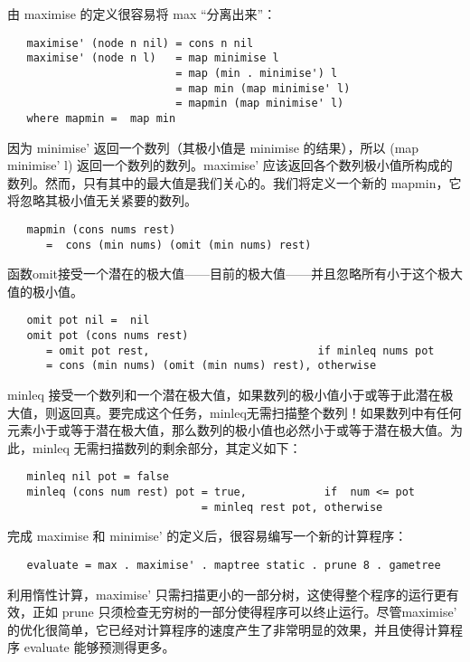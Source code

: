 \documentclass[12pt]{article}
\begin{document}
由 maximise 的定义很容易将 max ``分离出来''：

\begin{verbatim}
   maximise' (node n nil) = cons n nil
   maximise' (node n l)   = map minimise l
                          = map (min . minimise') l
                          = map min (map minimise' l)
                          = mapmin (map minimise' l)
   where mapmin =  map min
\end{verbatim}

因为 minimise' 返回一个数列（其极小值是 minimise 的结果），所以 (map minimise' l) 返回一个数列的数列。maximise' 应该返回各个数列极小值所构成的数列。然而，只有其中的最大值是我们关心的。我们将定义一个新的 mapmin，它将忽略其极小值无关紧要的数列。

\begin{verbatim}
   mapmin (cons nums rest)
      =  cons (min nums) (omit (min nums) rest)
\end{verbatim}

函数omit接受一个潜在的极大值——目前的极大值——并且忽略所有小于这个极大值的极小值。
\begin{verbatim}
   omit pot nil =  nil
   omit pot (cons nums rest)
      = omit pot rest,                          if minleq nums pot
      = cons (min nums) (omit (min nums) rest), otherwise
\end{verbatim}

minleq 接受一个数列和一个潜在极大值，如果数列的极小值小于或等于此潜在极大值，则返回真。要完成这个任务，minleq无需扫描整个数列！如果数列中有任何元素小于或等于潜在极大值，那么数列的极小值也必然小于或等于潜在极大值。为此，minleq 无需扫描数列的剩余部分，其定义如下：

\begin{verbatim}
   minleq nil pot = false
   minleq (cons num rest) pot = true,            if  num <= pot
                              = minleq rest pot, otherwise
\end{verbatim}

完成 maximise 和 minimise' 的定义后，很容易编写一个新的计算程序：

\begin{verbatim}
   evaluate = max . maximise' . maptree static . prune 8 . gametree
\end{verbatim}

利用惰性计算，maximise' 只需扫描更小的一部分树，这使得整个程序的运行更有效，正如 prune 只须检查无穷树的一部分使得程序可以终止运行。尽管maximise' 的优化很简单，它已经对计算程序的速度产生了非常明显的效果，并且使得计算程序 evaluate 能够预测得更多。
\end{document}

